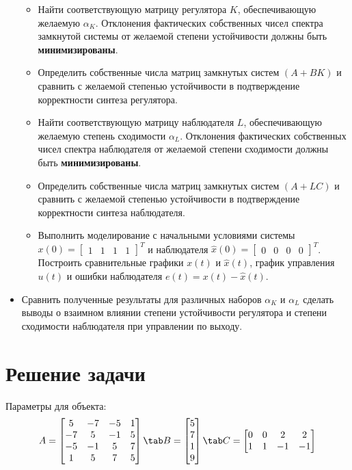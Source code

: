 \begin{itemize}
\begin{itemize}
  \item Найти соответствующую матрицу регулятора $K$, обеспечивающую желаемую $\alpha_K$. 
  Отклонения фактических собственных чисел спектра замкнутой системы от желаемой
  степени устойчивости должны быть \textbf{минимизированы}.
  \item Определить собственные числа матриц замкнутых систем $(A+BK)$ и сравнить 
  с желаемой степенью устойчивости в подтверждение корректности синтеза регулятора.
  \item Найти соответствующую матрицу наблюдателя $L$, обеспечивающую желаемую степень сходимости $\alpha_L$. 
  Отклонения фактических собственных чисел спектра наблюдателя от желаемой степени сходимости должны быть \textbf{минимизированы}.
  \item Определить собственные числа матриц замкнутых систем $(A+LC)$ и сравнить с желаемой степенью устойчивости в подтверждение корректности синтеза наблюдателя.
  \item Выполнить моделирование с начальными условиями системы 
  $x(0) = \begin{bmatrix} 1&1&1&1 \end{bmatrix}^T$ и наблюдателя $\hat{x}(0)=\begin{bmatrix}0 & 0& 0 &0\end{bmatrix}^T $.
  Построить  сравнительные графики $x(t)$ и $\hat{x}(t)$, график управления $u(t)$ и ошибки наблюдателя
   $e(t) = x(t) - \hat{x}(t)$.
  
\end{itemize}
\item Сравнить полученные результаты для различных наборов $\alpha_K$ и $\alpha_L$ 
сделать выводы о взаимном влиянии степени устойчивости регулятора и степени 
сходимости наблюдателя при управлении по выходу.
\end{itemize}
    
\newpage
\section{Решение задачи}

Параметры для объекта:
$$
  A = \begin{bmatrix}
    5  &  -7   & -5  &   1 \\
   -7   &  5  &  -1   &  5 \\
   -5  &  -1  &   5   &  7 \\
    1  &   5  &   7   &  5

  \end{bmatrix} \tab
  B = \begin{bmatrix}
    5\\7\\1\\9
  \end{bmatrix} \tab
  C = \begin{bmatrix}
    0 & 0 & 2 & 2\\
    1 & 1 & -1 & -1
  \end{bmatrix}
$$

